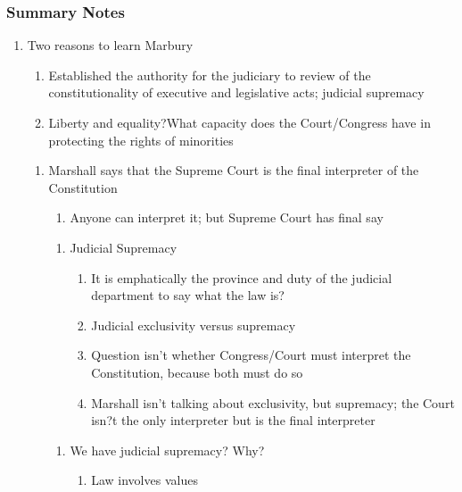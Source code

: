 \subsubsection{Summary Notes}
\begin{enumerate}
\item Two reasons to learn Marbury
	\begin {enumerate}
	\item Established the authority for the judiciary to review of the constitutionality of executive and legislative acts; judicial supremacy
	\item Liberty and equality?What capacity does the Court/Congress have in protecting the rights of minorities
	\end{enumerate}
\begin {enumerate}
\item Marshall says that the Supreme Court is the final interpreter of the Constitution 
	\begin{enumerate}
	\item Anyone can interpret it; but Supreme Court has final say
	\end{enumerate}
\begin{enumerate} 
\item Judicial Supremacy 
\begin{enumerate}
	\item It is emphatically the province and duty of the judicial department to say what the law is?
	\item Judicial exclusivity versus supremacy
		\item Question isn't whether Congress/Court must interpret the Constitution, because both must do so
		\item Marshall isn't talking about exclusivity, but supremacy; the Court isn?t the only interpreter but is the final interpreter
\end{enumerate}
\end{enumerate}
\begin{enumerate}
	\item We have judicial supremacy?  Why?
		\begin{enumerate} 
			\item Law involves values
				

\end{enumerate}
\end{enumerate}
\end{enumerate}
\end{enumerate}
